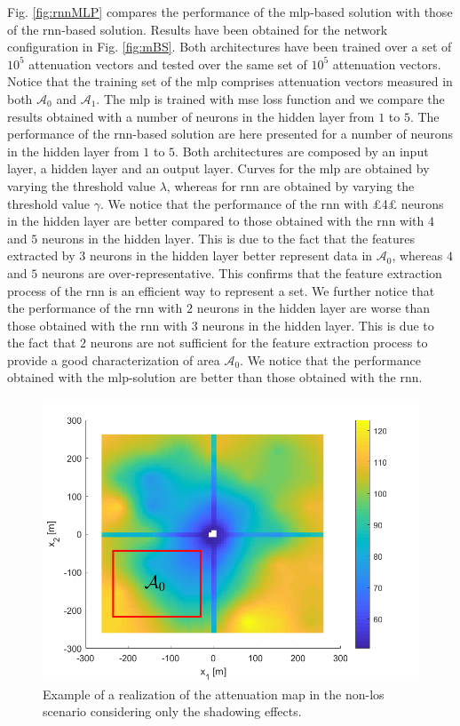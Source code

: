 \documentclass[draftcls,onecolumn,12pt]{IEEEtran}
\begin{document}
Fig. \ref{fig:rnnMLP} compares the performance of the \ac{mlp}-based solution with those of the \ac{rnn}-based solution. Results have been obtained for the network configuration in Fig. \ref{fig:mBS}. Both architectures have been trained over a set of $10^5$ attenuation vectors and tested over the same set of $10^5$ attenuation vectors. Notice that the training set of the \ac{mlp} comprises attenuation vectors measured in both $\mathcal{A}_0$ and $\mathcal{A}_1$. The \ac{mlp} is trained with \ac{mse} loss function and we compare the results obtained with a number of neurons in the hidden layer from $1$ to $5$. The performance of the \ac{rnn}-based solution are here presented for a number of neurons in the hidden layer from $1$ to $5$. Both architectures are composed by an input layer, a hidden layer and an output layer. Curves for the \ac{mlp} are obtained by varying the threshold value $\lambda$, whereas for \ac{rnn} are obtained by varying the threshold value $\gamma$. We notice that the performance of the \ac{rnn} with £4£ neurons in the hidden layer are better compared to those obtained with the \ac{rnn} with $4$ and $5$ neurons in the hidden layer. This is due to the fact that the features extracted by $3$ neurons in the hidden layer better represent data in $\mathcal{A}_0$, whereas $4$ and $5$ neurons are over-representative. This confirms that the feature extraction process of the \ac{rnn} is an efficient way to represent a set. We further notice that the performance of the \ac{rnn} with $2$ neurons in the hidden layer are worse than those obtained with the \ac{rnn} with $3$ neurons in the hidden layer. This is due to the fact that $2$ neurons are not sufficient for the feature extraction process to provide a good characterization of area $\mathcal{A}_0$. We notice that the performance obtained with the \ac{mlp}-solution are better than those obtained with the \ac{rnn}. 

\begin{figure}
    \centering
    \includegraphics[width=0.5\columnwidth]{surfColorato.png}
    \caption{Example of a realization of the attenuation map in the non-\ac{los} scenario considering only the shadowing effects.}
    \label{fig:map}
\end{figure}
\end{document}
